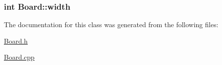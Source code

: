 \subsubsection[{width}]{\setlength{\rightskip}{0pt plus 5cm}int Board\+::width}\label{classBoard_a90a8efaa4736af25511ac948bdd27d6c}


The documentation for this class was generated from the following files\+:\begin{DoxyCompactItemize}
\item 
\hyperlink{Board_8h}{Board.\+h}\item 
\hyperlink{Board_8cpp}{Board.\+cpp}\end{DoxyCompactItemize}
